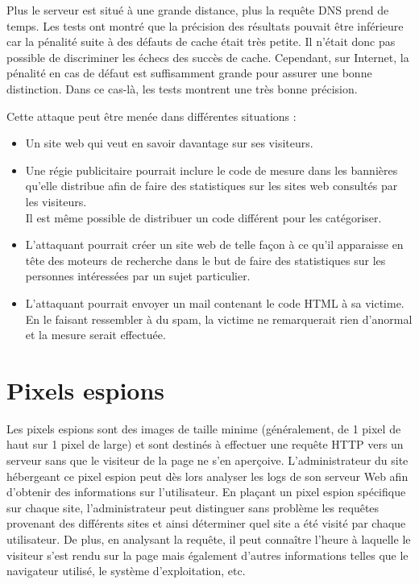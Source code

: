 Plus le serveur est situé à une grande distance, plus la requête DNS prend de temps. Les tests ont montré que la précision des résultats pouvait être inférieure car la pénalité suite à des défauts de cache était très petite. Il n'était donc pas possible de discriminer les échecs des succès de cache. Cependant, sur Internet, la pénalité en cas de défaut est suffisamment grande pour assurer une bonne distinction. Dans ce cas-là, les tests montrent une très bonne précision.
\newline


Cette attaque peut être menée dans différentes situations :
\begin{itemize}
  \item Un site web qui veut en savoir davantage sur ses visiteurs.
  \item Une régie publicitaire pourrait inclure le code de mesure dans les bannières qu'elle distribue afin de faire des statistiques sur les sites web consultés par les visiteurs.\\Il est même possible de distribuer un code différent pour les catégoriser.
  \item L'attaquant pourrait créer un site web de telle façon à ce qu'il apparaisse en tête des moteurs de recherche dans le but de faire des statistiques sur les personnes intéressées par un sujet particulier.
  \item L'attaquant pourrait envoyer un mail contenant le code HTML à sa victime.\\En le faisant ressembler à du spam, la victime ne remarquerait rien d'anormal et la mesure serait effectuée.
\end{itemize}



\section{Pixels espions}
Les pixels espions sont des images de taille minime (généralement, de 1 pixel de haut sur 1 pixel de large) et sont destinés à effectuer une requête HTTP vers un serveur sans que le visiteur de la page ne s'en aperçoive. L'administrateur du site hébergeant ce pixel espion peut dès lors analyser les logs de son serveur Web afin d'obtenir des informations sur l'utilisateur. En plaçant un pixel espion spécifique sur chaque site, l'administrateur peut distinguer sans problème les requêtes provenant des différents sites et ainsi déterminer quel site a été visité par chaque utilisateur. De plus, en analysant la requête, il peut connaître l'heure à laquelle le visiteur s'est rendu sur la page mais également d'autres informations telles que le navigateur utilisé, le système d'exploitation, etc.

